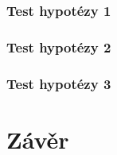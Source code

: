 \documentclass[11pt, a4paper]{article}
\begin{document}
\subsubsection{Test hypotézy 1}


\subsubsection{Test hypotézy 2}

\subsubsection{Test hypotézy 3}

\section{Závěr}



    
\end{document}
